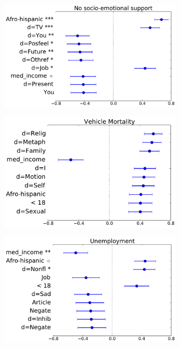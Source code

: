 \begin{figure}
\begin{subfigure}[b]{0.33\textwidth}
\label{fig.fastfoods}
\end{subfigure}
\begin{subfigure}[b]{0.33\textwidth}
\centering
\includegraphics[width=\columnwidth,height=.6\columnwidth]{figs/nosocialemotionalsupport}
\label{fig.nosocialemotionalsupport}
\end{subfigure}
\begin{subfigure}[b]{0.33\textwidth}
\centering
\includegraphics[width=\columnwidth,height=.6\columnwidth]{figs/mvmortalityrate}
\label{fig.mvmortalityrate}
\end{subfigure}
\begin{subfigure}[b]{0.33\textwidth}
\centering
\includegraphics[width=\columnwidth,height=.6\columnwidth]{figs/unemployed}

\end{subfigure}
\end{figure}
